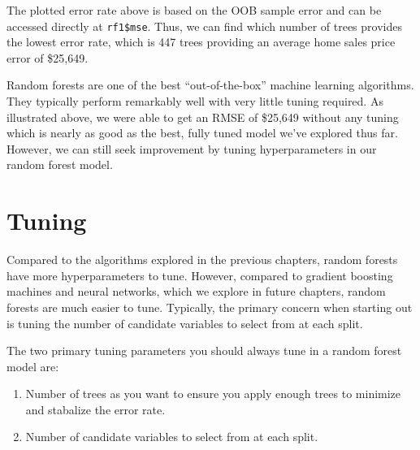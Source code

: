 \documentclass[]{book}
\newenvironment{Shaded}{\begin{snugshade}}{\end{snugshade}}
\newcommand{\CommentTok}[1]{\textcolor[rgb]{0.56,0.35,0.01}{\textit{#1}}}
\newcommand{\KeywordTok}[1]{\textcolor[rgb]{0.13,0.29,0.53}{\textbf{#1}}}
\newcommand{\NormalTok}[1]{#1}
\newcommand{\OperatorTok}[1]{\textcolor[rgb]{0.81,0.36,0.00}{\textbf{#1}}}
\providecommand{\tightlist}{%
  \setlength{\itemsep}{0pt}\setlength{\parskip}{0pt}}
\theoremstyle{definition}
\theoremstyle{definition}
\theoremstyle{definition}
\theoremstyle{remark}
\begin{document}
The plotted error rate above is based on the OOB sample error and can be
accessed directly at \texttt{rf1\$mse}. Thus, we can find which number
of trees provides the lowest error rate, which is 447 trees providing an
average home sales price error of \$25,649.

\begin{Shaded}
\end{Shaded}

Random forests are one of the best ``out-of-the-box'' machine learning
algorithms. They typically perform remarkably well with very little
tuning required. As illustrated above, we were able to get an RMSE of
\$25,649 without any tuning which is nearly as good as the best, fully
tuned model we've explored thus far. However, we can still seek
improvement by tuning hyperparameters in our random forest model.

\hypertarget{tuning-1}{%
\section{Tuning}\label{tuning-1}}

Compared to the algorithms explored in the previous chapters, random
forests have more hyperparameters to tune. However, compared to gradient
boosting machines and neural networks, which we explore in future
chapters, random forests are much easier to tune. Typically, the primary
concern when starting out is tuning the number of candidate variables to
select from at each split.

\begin{tip}
The two primary tuning parameters you should always tune in a random
forest model are:

\begin{enumerate}
\def\labelenumi{\arabic{enumi}.}
\tightlist
\item
  Number of trees as you want to ensure you apply enough trees to
  minimize and stabalize the error rate.
\item
  Number of candidate variables to select from at each split.
\end{enumerate}
\end{tip}
\end{document}
